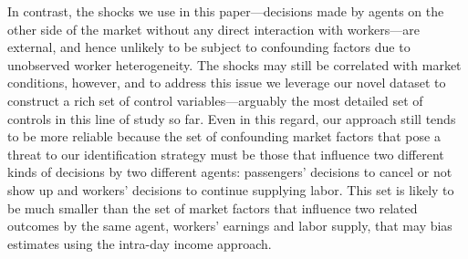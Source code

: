 \documentclass[reviewmode,AEJ]{AEA}
\begin{document}
In contrast, the shocks we use in this paper---decisions made by agents on the other side of the market without
any direct interaction with workers---are external, and hence unlikely to be subject to confounding factors 
due to unobserved worker heterogeneity. The shocks may still be correlated with market conditions, however, 
and to address this issue we leverage our novel dataset to construct a rich set of control variables---arguably 
the most detailed set of controls in this line of study so far. Even in this regard, our approach still tends
to be more reliable because the set of confounding market factors that pose a threat to our identification 
strategy must be those that influence two different kinds of decisions by two different agents: passengers'
decisions to cancel or not show up and workers' decisions to continue supplying labor. This set is likely
to be much smaller than the set of market factors that influence two related outcomes by the same agent,
workers' earnings and labor supply, that may bias estimates using the intra-day income approach.


\end{document}

